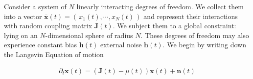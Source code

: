 Consider a system of $N$ linearly interacting degrees of freedom. We collect them into a vector $\mathbf{\bar x}(t) = \left(\,x_1(t),\cdots, x_N(t)\,\right)$ and represent their interactions with random coupling matrix $\mathbf{J}(t)$. We subject them to a global constraint: lying on an $N$-dimensional sphere of radius $N$. These degrees of freedom may also experience constant bias $\mathbf{h}(t)$ external noise $\mathbf{h}(t)$. We begin by writing down the Langevin Equation of motion

\begin{align}
\partial_t\mathbf{\bar x}(t) = (\mathbf{J}(t)-\mu(t))\mathbf{\bar x}(t)+\mathbf{n}(t)
\end{align}